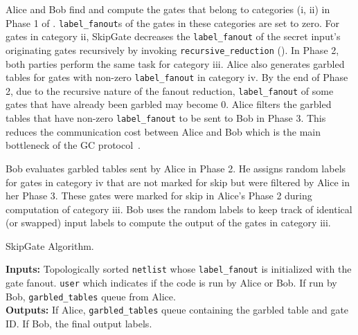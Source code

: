 Alice and Bob find and compute the gates that belong to categories (i, ii) in Phase 1 of .
\texttt{label\_fanout}s of the gates in these categories are set to zero.
For gates in category ii, SkipGate decreases the \texttt{label\_fanout} of the secret input's originating gates recursively by invoking \texttt{recursive\_reduction} ().
In Phase 2, both parties perform the same task for category iii.
Alice also generates garbled tables for gates with non-zero \texttt{label\_fanout} in category iv.
By the end of Phase 2, due to the recursive nature of the fanout reduction, \texttt{label\_fanout} of some gates that have already been garbled may become 0.
Alice filters the garbled tables that have non-zero \texttt{label\_fanout} to be sent to Bob in Phase 3.
This reduces the communication cost between Alice and Bob which is the main bottleneck of the GC protocol~\cite{gueron2015fast}.

Bob evaluates garbled tables sent by Alice in Phase 2.
He assigns random labels for gates in category iv that are not marked for skip but were filtered by Alice in her Phase 3.
These gates were marked for skip in Alice's Phase 2 during computation of category iii.
Bob uses the random labels to keep track of identical (or swapped) input labels to compute the output of the gates in category iii.

\begin{algorithm}[ht]
\caption{SkipGate Algorithm.}\label{skipgate_algorithm}
\textbf{Inputs:} Topologically sorted \texttt{netlist} whose \texttt{label\_fanout} is initialized with the gate fanout. \texttt{user} which indicates if the code is run by Alice or Bob. If run by Bob, \texttt{garbled\_tables} queue from Alice.\\
\textbf{Outputs:} If Alice, \texttt{garbled\_tables} queue containing the garbled table and gate ID. If Bob, the final output labels.\\
\begin{algorithmic}[1]
		\ENDIF
	\ENDIF
\ENDFOR
{}
\end{algorithmic}
\end{algorithm}

